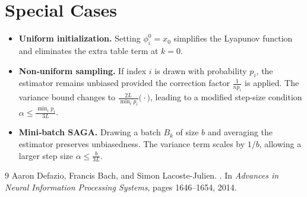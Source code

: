 \documentclass{article}
\begin{document}
\section{Special Cases}
\begin{itemize}
\item \textbf{Uniform initialization.} Setting $\phi_i^{0}=x_0$ simplifies the Lyapunov function and eliminates the extra table term at $k=0$.
\item \textbf{Non‑uniform sampling.} If index $i$ is drawn with probability $p_i$, the estimator remains unbiased provided the correction factor $\frac{1}{np_i}$ is applied. The variance bound changes to $\frac{2L}{\min_i p_i}\bigl(\cdot\bigr)$, leading to a modified step‑size condition $\alpha\le\frac{\min_i p_i}{3L}$.
\item \textbf{Mini‑batch SAGA.} Drawing a batch $B_k$ of size $b$ and averaging the estimator preserves unbiasedness. The variance term scales by $1/b$, allowing a larger step size $\alpha\le\frac{b}{3L}$.
\end{itemize}

\begin{thebibliography}{9}
Aaron Defazio, Francis Bach, and Simon Lacoste-Julien.
.
\newblock In \emph{Advances in Neural Information Processing Systems},
  pages 1646--1654, 2014.
\end{thebibliography}
\end{document}
